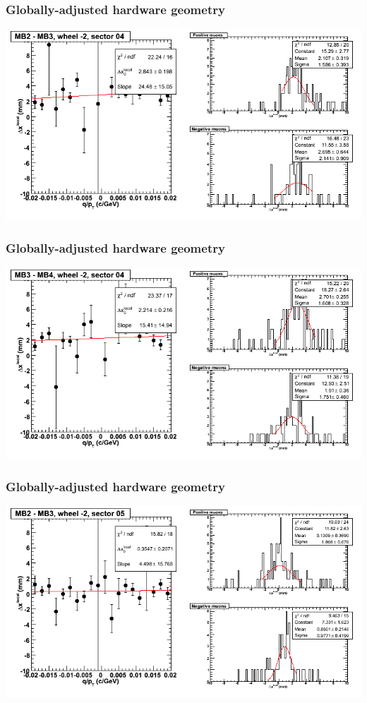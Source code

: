 \documentclass[compress]{beamer}
\begin{document}
\begin{frame}
\frametitle{Globally-adjusted hardware geometry}
\includegraphics[width=\linewidth]{NOV4_segdiffs_HW/dt13_resid_A_04_23.png}
\end{frame}

\begin{frame}
\frametitle{Globally-adjusted hardware geometry}
\includegraphics[width=\linewidth]{NOV4_segdiffs_HW/dt13_resid_A_04_34.png}
\end{frame}

\begin{frame}
\frametitle{Globally-adjusted hardware geometry}
\includegraphics[width=\linewidth]{NOV4_segdiffs_HW/dt13_resid_A_05_23.png}
\end{frame}
\end{document}
